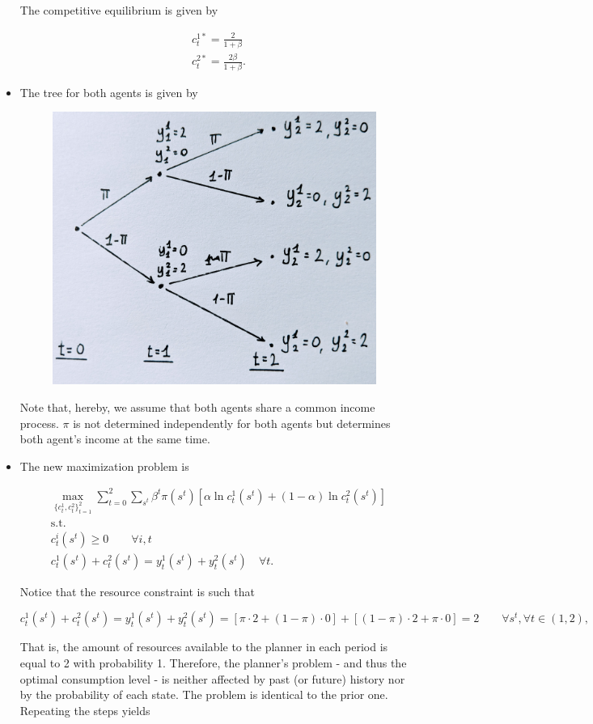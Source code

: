 \documentclass[12pt,a4paper]{article}
\begin{document}
\begin{itemize}
  The competitive equilibrium is given by

  \begin{align*}
    & c_t^{1*} = \frac{2}{1+\beta} \\
    & c_t^{2*} = \frac{2\beta}{1+\beta}.
  \end{align*}

  \item The tree for both agents is given by

  \begin{figure}[h!]
    \centering
    \includegraphics[width=0.5\linewidth]{./graph/Event_tree.jpg}
  \end{figure}

Note that, hereby, we assume that both agents share a common income process. $\pi$ is not determined independently for both agents but determines both agent's income at the same time.

\item The new maximization problem is

  \begin{align*}
    & \max_{\{ c_t^1, c_t^2 \}^{2}_{t = 1}} \sum^2_{t=0} \sum_{s^t} \beta^t \pi(s^t) [\alpha \ln c_t^1(s^t) + (1-\alpha) \ln c_t^2(s^t)] \\
    & \text{s.t.} \\
    & c_t^i(s^t) \geq 0 \qquad \forall i, t \\
    & c^1_t(s^t) + c^2_t(s^t) = y_t^1(s^t) +  y_t^2(s^t)\quad \forall t.
  \end{align*}

  Notice that the resource constraint is such that

    $$
      c^1_t(s^t) + c^2_t(s^t) = y_t^1(s^t) +  y_t^2(s^t) = [\pi \cdot 2 + (1-\pi) \cdot 0] + [(1-\pi) \cdot 2 + \pi \cdot 0] = 2 \qquad \forall s^t, \forall t \in (1,2),
    $$

That is, the amount of resources available to the planner in each period is equal to 2 with probability 1. Therefore, the planner's problem - and thus the optimal consumption level - is neither affected by past (or future) history nor by the probability of each state. The problem is identical to the prior one. Repeating the steps yields


\end{itemize}
\end{document}
